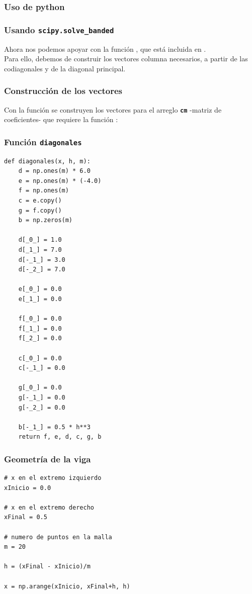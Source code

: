 \subsubsection{Uso de python}
\begin{frame}
\frametitle{Usando \texttt{scipy.solve\_banded}}
Ahora nos podemos apoyar con la función , que está incluida en .
\\
\bigskip
Para ello, debemos de construir los vectores columna necesarios, a partir de las codiagonales y  de la diagonal principal.
\end{frame}
\begin{frame}
\frametitle{Construcción de los vectores}
Con la función  se construyen los vectores para el arreglo \textbf{\texttt{cm}} -matriz de coeficientes- que requiere la función :
\end{frame}
\begin{frame}
\frametitle{Función \texttt{diagonales}}
\begin{lstlisting}[caption=Función que construye las codiagonales, style=FormattedNumber, basicstyle=\linespread{1.1}\ttfamily=\small, columns=fullflexible]
def diagonales(x, h, m):
    d = np.ones(m) * 6.0
    e = np.ones(m) * (-4.0)
    f = np.ones(m)
    c = e.copy()
    g = f.copy()
    b = np.zeros(m)
    
    d[_0_] = 1.0
    d[_1_] = 7.0
    d[-_1_] = 3.0
    d[-_2_] = 7.0
    
    e[_0_] = 0.0
    e[_1_] = 0.0
    
    f[_0_] = 0.0
    f[_1_] = 0.0
    f[_2_] = 0.0
    
    c[_0_] = 0.0
    c[-_1_] = 0.0
    
    g[_0_] = 0.0
    g[-_1_] = 0.0
    g[-_2_] = 0.0
    
    b[-_1_] = 0.5 * h**3
    return f, e, d, c, g, b
\end{lstlisting}
\end{frame}
\begin{frame}
\frametitle{Geometría de la viga}
\begin{lstlisting}[caption=Geometría de la viga, style=FormattedNumber, basicstyle=\linespread{1.1}\ttfamily=\small, columns=fullflexible]
 # x en el extremo izquierdo
xInicio = 0.0

# x en el extremo derecho
xFinal = 0.5

# numero de puntos en la malla
m = 20 

h = (xFinal - xInicio)/m

x = np.arange(xInicio, xFinal+h, h)
\end{lstlisting}
\end{frame}
